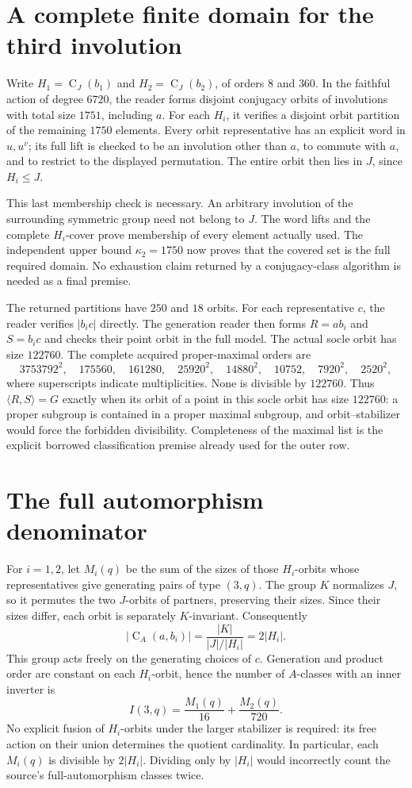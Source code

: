 \documentclass[11pt,a4paper]{article}
\newcommand{\C}{\operatorname{C}}
\begin{document}
\section{A complete finite domain for the third involution}
Write $H_1=\C_J(b_1)$ and $H_2=\C_J(b_2)$, of orders $8$ and $360$.
In the faithful action of degree $6720$, the reader forms disjoint
conjugacy orbits of involutions with total size $1751$, including $a$.
For each $H_i$, it verifies a disjoint orbit partition of the remaining
$1750$ elements. Every orbit representative has an explicit word in
$u,u^v$; its full lift is checked to be an involution other than $a$,
to commute with $a$, and to restrict to the displayed permutation.
The entire orbit then lies in $J$, since $H_i\le J$.

This last membership check is necessary. An arbitrary involution of the
surrounding symmetric group need not belong to $J$. The word lifts and
the complete $H_i$-cover prove membership of every element actually used.
The independent upper bound $\kappa_2=1750$ now proves that the covered
set is the full required domain. No exhaustion claim returned by a
conjugacy-class algorithm is needed as a final premise.

The returned partitions have $250$ and $18$ orbits. For each
representative $c$, the reader verifies $|b_i c|$ directly. The
generation reader then forms $R=ab_i$ and $S=b_i c$ and checks their
point orbit in the full model. The actual socle orbit has size $122760$.
The complete acquired proper-maximal orders are
\[
 3753792^2,\quad175560,\quad161280,\quad25920^2,\quad14880^2,
 \quad10752,\quad7920^2,\quad2520^2,
\]
where superscripts indicate multiplicities. None is divisible by
$122760$. Thus $\langle R,S\rangle=G$ exactly when its orbit of a point
in this socle orbit has size $122760$: a proper subgroup is contained
in a proper maximal subgroup, and orbit--stabilizer would force the
forbidden divisibility. Completeness of the maximal list is the
explicit borrowed classification premise already used for the outer row.

\section{The full automorphism denominator}
For $i=1,2$, let $M_i(q)$ be the sum of the sizes of those $H_i$-orbits
whose representatives give generating pairs of type $(3,q)$.
The group $K$ normalizes $J$, so it permutes the two $J$-orbits of
partners, preserving their sizes. Since their sizes differ, each orbit
is separately $K$-invariant. Consequently
\[
 |\C_A(a,b_i)|=\frac{|K|}{|J|/|H_i|}=2|H_i|.
\]
This group acts freely on the generating choices of $c$.
Generation and product order are constant on each $H_i$-orbit, hence
the number of $A$-classes with an inner inverter is
\[
 \boxed{\displaystyle I(3,q)=\frac{M_1(q)}{16}
                         +\frac{M_2(q)}{720}.}
\]
No explicit fusion of $H_i$-orbits under the larger stabilizer is
required: its free action on their union determines the quotient
cardinality. In particular, each $M_i(q)$ is divisible by $2|H_i|$.
Dividing only by $|H_i|$ would incorrectly count the source's
full-automorphism classes twice.
\end{document}
